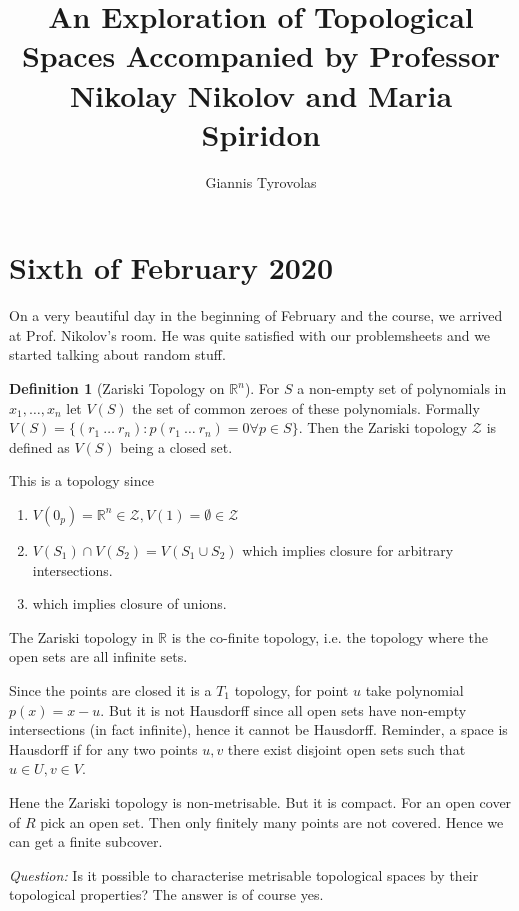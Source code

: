 \documentclass[11pt,a4paper]{article}
\title{An Exploration of Topological Spaces Accompanied by Professor Nikolay Nikolov and Maria Spiridon}
\author{Giannis Tyrovolas}
\theoremstyle{definition}
\newtheorem{definition}[theorem]{Definition}
\begin{document}
\maketitle

\section{Sixth of February 2020}

On a very beautiful day in the beginning of February and the course, we arrived at Prof. Nikolov's room. He was quite satisfied with our problemsheets and we started talking about random stuff.


\begin{definition}[Zariski Topology on $\mathbb{R}^n$]

For $S$ a non-empty set of polynomials in $x_1,\ldots,x_n$ let $V(S)$ the set of common zeroes of these polynomials. Formally $V(S) = \{(r_1 \ \ldots \ r_n) \colon p(r_1 \ \ldots \ r_n ) = 0 \forall p \in S\}$. Then the Zariski topology $\mathcal{Z}$ is defined as $V(S)$ being a closed set.
\end{definition}

This is a topology since

\begin{enumerate}
	\item $V(0_p) = \mathbb{R}^n \in \mathcal{Z}, V(1) = \emptyset \in \mathcal{Z}$
	\item $V(S_1) \cap V(S_2) = V(S_1 \cup S_2)$ which implies closure for arbitrary intersections.
	\item  which implies closure of unions.
\end{enumerate}

The Zariski topology in $\mathbb{R}$ is the co-finite topology, i.e. the topology where the open sets are all infinite sets.

Since the points are closed it is a $T_1$ topology, for point $u$ take polynomial $p(x) = x - u$. But it is not Hausdorff since all open sets have non-empty intersections (in fact infinite), hence it cannot be Hausdorff. Reminder, a space is Hausdorff if for any two points $u,v$ there exist disjoint open sets such that $u \in U, v\in V$.

Hene the Zariski topology is non-metrisable. But it is compact. For an open cover of $R$ pick an open set. Then only finitely many points are not covered. Hence we can get a finite subcover.

\emph{Question:} Is it possible to characterise metrisable topological spaces by their topological properties?
The answer is of course yes.
\end{document}

